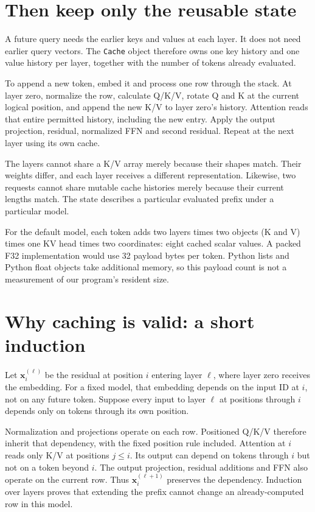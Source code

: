 \section{Then keep only the reusable state}
A future query needs the earlier keys and values at each layer.
It does not need earlier query vectors. The \texttt{Cache} object
therefore owns one key history and one value history per layer, together
with the number of tokens already evaluated.

To append a new token, embed it and process one row through the stack.
At layer zero, normalize the row, calculate Q/K/V, rotate Q and K at
the current logical position, and append the new K/V to layer zero's
history. Attention reads that entire permitted history, including the
new entry. Apply the output projection, residual, normalized FFN and
second residual. Repeat at the next layer using its own cache.

The layers cannot share a K/V array merely because their shapes match.
Their weights differ, and each layer receives a different representation.
Likewise, two requests cannot share mutable cache histories merely
because their current lengths match. The state describes a particular
evaluated prefix under a particular model.

For the default model, each token adds two layers times two objects
(K and V) times one KV head times two coordinates: eight cached scalar
values. A packed F32 implementation would use 32 payload bytes per token.
Python lists and Python float objects take additional memory, so this
payload count is not a measurement of our program's resident size.

\section{Why caching is valid: a short induction}
Let $\mathbf x_i^{(\ell)}$ be the residual at position $i$ entering
layer $\ell$, where layer zero receives the embedding. For a fixed
model, that embedding depends on the input ID at $i$, not on any future
token. Suppose every input to layer $\ell$ at positions through $i$
depends only on tokens through its own position.

Normalization and projections operate on each row. Positioned Q/K/V
therefore inherit that dependency, with the fixed position rule included.
Attention at $i$ reads only K/V at positions $j\le i$. Its output can
depend on tokens through $i$ but not on a token beyond $i$.
The output projection, residual additions and FFN also operate on the
current row. Thus $\mathbf x_i^{(\ell+1)}$ preserves the dependency.
Induction over layers proves that extending the prefix cannot change
an already-computed row in this model.

